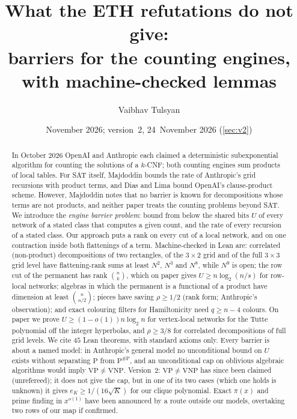 \documentclass[10pt]{amsart}
\theoremstyle{plain}
\theoremstyle{definition}
\theoremstyle{remark}
\numberwithin{equation}{section}
\begin{document}
\title[What the ETH refutations do not give]{What the ETH refutations do not give:\\ barriers for the counting engines, with machine-checked lemmas}

\author{Vaibhav Tulsyan}

\date{November 2026; version~2, 24~November 2026 (\cref{sec:v2})}


\begin{abstract}
In October 2026 OpenAI and Anthropic each claimed a deterministic subexponential algorithm for
counting the solutions of a $k$-CNF; both counting engines sum products of local tables. For SAT
itself, Majdoddin bounds the rate of Anthropic's grid recursions with product terms, and Dias and
Lima bound OpenAI's clause-product scheme. However, Majdoddin notes that no barrier is known for
decompositions whose terms are not products, and neither paper treats the counting problems beyond
SAT. We introduce the \emph{engine barrier problem}: bound from below the shared bits $U$ of every
network of a stated class that computes a given count, and the rate of every recursion of a stated
class. Our approach puts a rank on every cut of a local network, and on one contraction inside both
flattenings of a term. Machine-checked in Lean are: correlated (non-product) decompositions of two
rectangles, of the $3\times2$ grid and of the full $3\times3$ grid level have flattening-rank sums
at least $N^2$, $N^3$ and $N^8$, while $N^9$ is open; the row cut of the permanent has rank $\binom
nk$, which on paper gives $U\ge n\log_2(n/s)$ for row-local networks; algebras in which the
permanent is a functional of a product have dimension at least $\binom n{n/2}$; pieces have saving
$\rho\ge1/2$ (rank form; Anthropic's observation); and exact colouring filters for Hamiltonicity
need $q\ge n-4$ colours. On paper we prove $U\ge(1-o(1))n\log_2n$ for vertex-local networks for the
Tutte polynomial off the integer hyperbolas, and $\rho\ge3/8$ for correlated decompositions of full
grid levels. We cite $45$ Lean theorems, with standard axioms only. Every barrier is about a named
model: in Anthropic's general model no unconditional bound on $U$ exists without separating $\mathrm
P$ from $\mathrm P^{\#\mathrm P}$, and an unconditional cap on oblivious algebraic algorithms would
imply $\mathrm{VP}\ne\mathrm{VNP}$. Version~2: $\mathrm{VP}\ne\mathrm{VNP}$ has since been claimed
(unrefereed); it does not give the cap, but in one of its two cases (which one holds is unknown) it
gives $e_K\ge1/(16\sqrt K)$ for our clique polynomial. Exact $\pi(x)$ and prime finding in $x^{o(1)}$
have been announced by a route outside our models, overtaking two rows of our map if confirmed.
\end{abstract}
\end{document}
